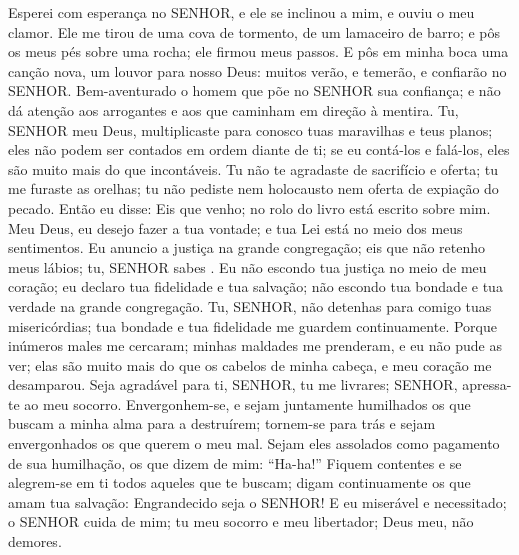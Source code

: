 {\PP 
  Esperei com esperança no SENHOR, e ele se inclinou a mim, e ouviu o meu clamor.
  Ele me tirou de uma cova de tormento, de um lamaceiro de barro; e pôs os meus pés sobre uma rocha; ele firmou meus passos.
  E pôs em minha boca uma canção nova, um louvor para nosso Deus: muitos
{} verão, e temerão, e confiarão no SENHOR.
  Bem-aventurado
{} o homem que põe no SENHOR sua confiança; e não dá atenção aos arrogantes e aos que caminham em direção à mentira.
  Tu, SENHOR meu Deus, multiplicaste para conosco tuas maravilhas e teus planos; eles não podem ser contados em ordem diante de ti; se eu
{} contá-los e falá-los, eles são muito mais do que incontáveis.
  Tu não te agradaste de sacrifício e oferta;
{} tu me furaste as orelhas; tu não pediste nem holocausto nem oferta de expiação do pecado.
  Então eu disse: Eis que venho; no rolo do livro está escrito sobre mim.
  Meu Deus, eu desejo fazer a tua vontade; e tua Lei está no meio dos meus sentimentos.
  Eu anuncio a justiça na grande congregação; eis que não retenho meus lábios; tu, SENHOR sabes
{} .
  Eu não escondo tua justiça no meio de meu coração; eu declaro tua fidelidade e tua salvação; não escondo tua bondade e tua verdade na grande congregação.
  Tu, SENHOR, não detenhas para comigo tuas misericórdias; tua bondade e tua fidelidade me guardem continuamente.
  Porque inúmeros males me cercaram; minhas maldades me prenderam, e eu não pude as ver; elas são muito mais do que os cabelos de minha cabeça, e meu coração me desamparou.
  Seja agradável para ti, SENHOR, tu me livrares; SENHOR, apressa-te ao meu socorro.
  Envergonhem-se, e sejam juntamente humilhados os que buscam a minha alma para a destruírem; tornem-se para trás e sejam envergonhados os que querem o meu mal.
  Sejam eles assolados como pagamento de sua humilhação, os que dizem de mim: “Ha-ha!”
  Fiquem contentes e se alegrem-se em ti todos aqueles que te buscam; digam continuamente os que amam tua salvação: Engrandecido seja o SENHOR!
  E eu
{} miserável e necessitado;
{} o SENHOR cuida de mim; tu
{} meu socorro e meu libertador; Deus meu, não demores.
\par }


